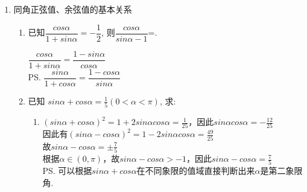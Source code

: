 \begin{enumerate}
\begin{enumerate}
\begin{jieda}
\begin{enumerate}[1.]
                故当$m \in (-\infty, 3)$时，满足要求.
            \end{enumerate}
            \ps \textbf{重要的是问题的转化！}
        \end{jieda}
    \end{enumerate}
    \item 同角正弦值、余弦值的基本关系
    \begin{enumerate}
        \item 已知$\dfrac{ cos\alpha}{1+ sin\alpha}=-\dfrac{1}{2}$, 则$\dfrac{ cos\alpha}{ sin\alpha-1}$=. 
        \begin{jieda}
        $\dfrac{ cos\alpha}{1+ sin\alpha}= \dfrac{1-sin\alpha}{cos\alpha}$ \\
        \ps $\dfrac{ sin\alpha}{1+ cos\alpha}= \dfrac{1-cos\alpha}{sin\alpha}$ 
        \end{jieda}
        \item 已知 $ sin \alpha+ cos \alpha=\frac{1}{5}(0<\alpha<\pi)$, 求: \\
\begin{jieda}
    \begin{enumerate}
        \item $(sin\alpha+cos\alpha)^2 = 1 + 2sin\alpha cos\alpha = \frac{1}{25}$，因此$sin\alpha cos\alpha = -\frac{12}{25}$ \\
        因此有$(sin\alpha - cos\alpha)^2 = 1 - 2sin\alpha cos\alpha = \frac{49}{25}$ \\
        故$sin\alpha - cos\alpha = \pm \frac{7}{5}$
        \\
        根据$\alpha \in (0, \pi)$，故$sin \alpha - cos\alpha > -1$，因此$sin\alpha - cos\alpha = \frac{7}{5}$ \\
        \ps 可以根据$sin\alpha + cos\alpha$在不同象限的值域直接判断出来$\alpha$是第二象限角.

\end{enumerate}
\end{jieda}
\end{enumerate}
\end{enumerate}
